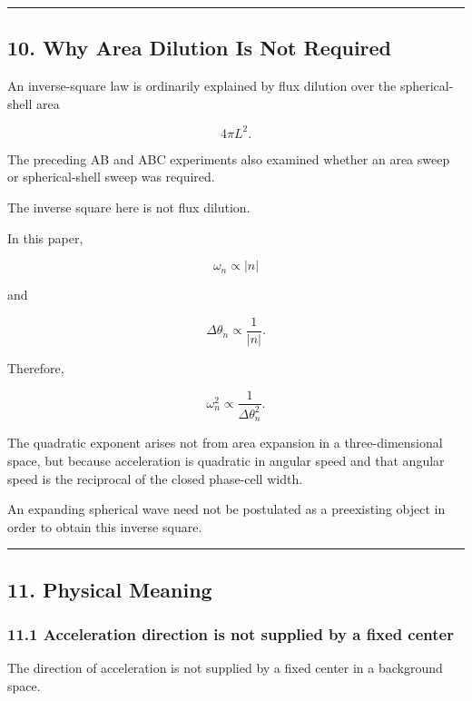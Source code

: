 \documentclass[
  10pt,
  a4paper,
]{article}
\begin{document}
\begin{center}\rule{0.5\linewidth}{0.5pt}\end{center}

\subsection{10. Why Area Dilution Is Not
Required}\label{why-area-dilution-is-not-required}

An inverse-square law is ordinarily explained by flux dilution over the
spherical-shell area

\[
4\pi L^2.
\]

The preceding AB and ABC experiments also examined whether an area sweep
or spherical-shell sweep was required.

The inverse square here is not flux dilution.

In this paper,

\[
\omega_n\propto|n|
\]

and

\[
\Delta\theta_n\propto\frac{1}{|n|}.
\]

Therefore,

\[
\omega_n^2
\propto
\frac{1}{\Delta\theta_n^2}.
\]

The quadratic exponent arises not from area expansion in a
three-dimensional space, but because acceleration is quadratic in
angular speed and that angular speed is the reciprocal of the closed
phase-cell width.

An expanding spherical wave need not be postulated as a preexisting
object in order to obtain this inverse square.

\begin{center}\rule{0.5\linewidth}{0.5pt}\end{center}

\subsection{11. Physical Meaning}\label{physical-meaning}

\subsubsection{11.1 Acceleration direction is not supplied by a fixed
center}\label{acceleration-direction-is-not-supplied-by-a-fixed-center}

The direction of acceleration is not supplied by a fixed center in a
background space.
\end{document}
